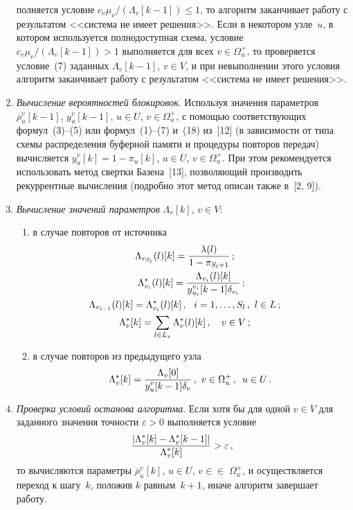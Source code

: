 \begin{multicols}{2}
\begin{enumerate}[1.]
\noindent
полняется условие 
$c_v\mu_v/(\Lambda_v[k-1])\leq 1$, то алгоритм заканчивает работу с 
результатом <<сис\-те\-ма не имеет решения>>. Если в некотором узле~$u$, 
в котором используется полнодоступная схема, условие 
$c_v\mu_v/(\Lambda_v[k-1])> 1$ выполняется для всех $v\in\Omega_u^+$, 
то проверяется условие~(7) заданных $\Lambda_v[k-1]$, $v\in V$, и при 
невыполнении этого условия алгоритм заканчивает работу с результатом 
<<система не имеет решения>>.
     \item \textit{Вычисление вероятностей блокировок}. Используя 
значения параметров $\overline{\rho}_u^v[k-1]$, $y_u^v[k-1]$, $u\in U$, 
$v\in\Omega_u^+$, с помощью соответствующих формул~(3)--(5) или 
формул~(1)--(7) и~(18) из~[12] (в зависимости от типа схемы 
распределения буферной памяти и процедуры повторов передач) 
вычисляется $y_u^v[k]=1-\pi_u[k]$, $u\in U$, $v\in\Omega_u^+$. При этом 
рекомендуется использовать метод свертки Базена~[13], 
позволяющий производить рекуррентные вычисления (подробно этот 
метод описан также в~[2, 9]).
     \item \textit{Вычисление значений параметров} $\Lambda_v[k]$, $v\in V$:
     \begin{enumerate}[($i$)]
     \item в случае повторов от источника
     \begin{gather*}
\!\!\!\!     \!\!\!\!\Lambda_{v_{S_l}}(l)[k]=\fr{\lambda(l)}{1-\pi_{S_l+1}}\,;\\  \Lambda_{v_i}^*(l)[k]=
     \fr{\Lambda_{v_i}(l)[k]}{y^{v_i}_{u_i}[k-1]\delta_{v_i}}\,;\\
        \!\!\!\! \!\!\!\! \Lambda_{v_{i-1}}(l)[k]=\Lambda_{v_i}^*(l)[k]\,,\ \ i=1,\ldots ,S_l\,,\ l\in 
L\,;\\
\!\!\!\!         \!\!\!\! \Lambda_v^*[k] = \sum\limits_{l\in L_v} \Lambda_v^*(l)[k]\,,\quad 
v\in V\,;
     \end{gather*}
     \item в случае повторов из предыдущего узла
     \begin{equation*}
     \Lambda_v^*[k]=\displaystyle\frac{\displaystyle \Lambda_v[0]\mathstrut}{\displaystyle y_u^v[k-1]\delta_v\mathstrut}\,,\
v\in\Omega_u^+\,,\enskip u\in U\,.
     \end{equation*}
     \end{enumerate}
     \item \textit{Проверка условий останова алгоритма}. Если хотя бы для 
одной $v\in V$ для заданного значения точности $\varepsilon >0$ выполняется 
условие
     $$
     \displaystyle\frac{\displaystyle \vert \Lambda_v^*[k]-\Lambda_v^*[k-1]\vert\mathstrut}{\displaystyle \Lambda_v^*[k]\mathstrut} 
>\varepsilon\,,
     $$
     то вычисляются параметры $\overline{\rho}_u^v[k]$, $u\in U$, 
$v\in$\linebreak $\in\;\Omega_u^+$, и осуществляется переход к шагу~$k$, положив $k$ 
равным~$k+1$, иначе алгоритм завершает работу.
     \end{enumerate}
     

\end{multicols}
